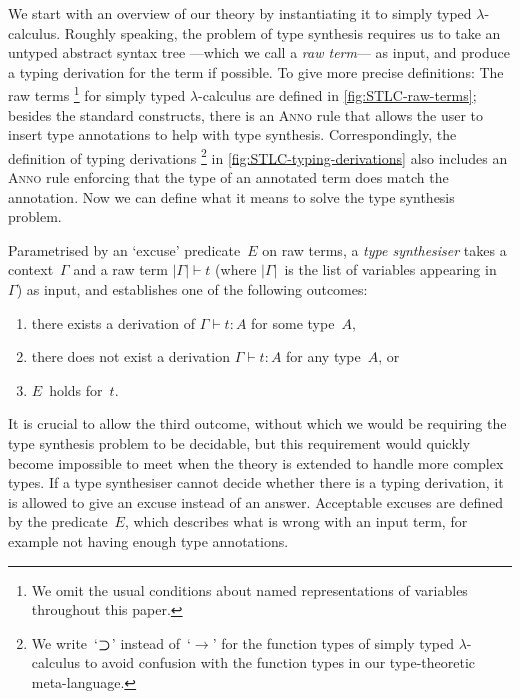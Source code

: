 We start with an overview of our theory by instantiating it to simply typed $\lambda$-calculus.
Roughly speaking, the problem of type synthesis requires us to take an untyped abstract syntax tree ---which we call a \emph{raw term}--- as input, and produce a typing derivation for the term if possible.
To give more precise definitions:
The raw terms%
\footnote{We omit the usual conditions about named representations of variables throughout this paper.}
for simply typed $\lambda$-calculus are defined in \cref{fig:STLC-raw-terms};
besides the standard constructs, there is an \textsc{Anno} rule that allows the user to insert type annotations to help with type synthesis.
Correspondingly, the definition of typing derivations%
\footnote{We write~`$\mathbin{\bm{\supset}}$' instead of~`$\to$' for the function types of simply typed $\lambda$-calculus to avoid confusion with the function types in our type-theoretic meta-language.}
in \cref{fig:STLC-typing-derivations} also includes an \textsc{Anno} rule enforcing that the type of an annotated term does match the annotation.
Now we can define what it means to solve the type synthesis problem.

\begin{definition}
\label{def:STLC-type-synthesiser}
Parametrised by an `excuse' predicate~$E$ on raw terms, a \emph{type synthesiser} takes a context~$\Gamma$ and a raw term $|\Gamma| \vdash t$ (where $|\Gamma|$~is the list of variables appearing in~$\Gamma$) as input, and establishes one of the following outcomes:
\begin{enumerate}
\item there exists a derivation of $\Gamma \vdash t : A$ for some type~$A$,
\item there does not exist a derivation $\Gamma \vdash t : A$ for any type~$A$, or
\item $E$~holds for~$t$.
\end{enumerate}
\end{definition}

It is crucial to allow the third outcome, without which we would be requiring the type synthesis problem to be decidable, but this requirement would quickly become impossible to meet when the theory is extended to handle more complex types.
If a type synthesiser cannot decide whether there is a typing derivation, it is allowed to give an excuse instead of an answer.
Acceptable excuses are defined by the predicate~$E$, which describes what is wrong with an input term, for example not having enough type annotations.

